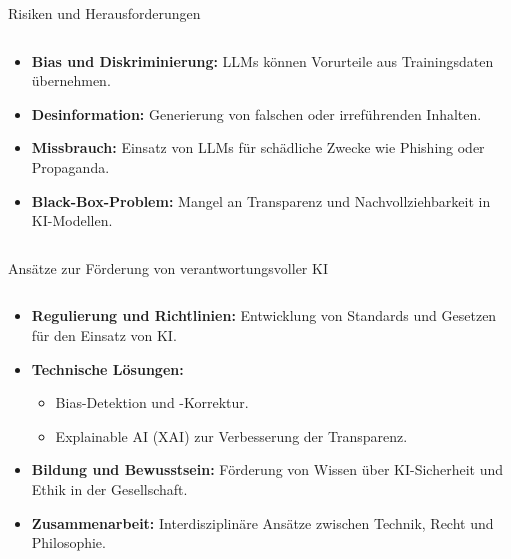 \documentclass[aspectratio=1610, xcolor=dvipsnames, 9pt]{beamer}
\begin{document}
\begin{frame}{Risiken und Herausforderungen}
  \begin{columns}
    \begin{column}{1\textwidth}
      \begin{itemize}
        \item \textbf{Bias und Diskriminierung:} LLMs können Vorurteile aus Trainingsdaten übernehmen.
        \item \textbf{Desinformation:} Generierung von falschen oder irreführenden Inhalten.
        \item \textbf{Missbrauch:} Einsatz von LLMs für schädliche Zwecke wie Phishing oder Propaganda.
        \item \textbf{Black-Box-Problem:} Mangel an Transparenz und Nachvollziehbarkeit in KI-Modellen.
      \end{itemize}
    \end{column}
  \end{columns}
\end{frame}

\begin{frame}{Ansätze zur Förderung von verantwortungsvoller KI}
  \begin{columns}
    \begin{column}{1\textwidth}
      \begin{itemize}
        \item \textbf{Regulierung und Richtlinien:} Entwicklung von Standards und Gesetzen für den Einsatz von KI.
        \item \textbf{Technische Lösungen:} 
          \begin{itemize}
            \item Bias-Detektion und -Korrektur.
            \item Explainable AI (XAI) zur Verbesserung der Transparenz. 
          \end{itemize}
        \item \textbf{Bildung und Bewusstsein:} Förderung von Wissen über KI-Sicherheit und Ethik in der Gesellschaft.
        \item \textbf{Zusammenarbeit:} Interdisziplinäre Ansätze zwischen Technik, Recht und Philosophie.
      \end{itemize}
    \end{column}
  \end{columns}
\end{frame}
\end{document}
